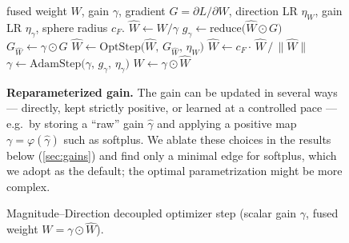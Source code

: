 \documentclass[10pt]{article} %
\newcommand{\What}{\widehat{W}}              %
\newcommand{\reduceop}{\mathrm{reduce}}
\newcommand{\OptStep}{\mathrm{OptStep}}
\newcommand{\AdamStep}{\mathrm{AdamStep}}
\begin{document}
\begin{figure}[t]
\begin{algorithm}[t]
\caption{Magnitude--Direction decoupled optimizer step (scalar gain $\gamma$, fused weight $W=\gamma\odot\What$).}
\label{alg:md-step}
\begin{algorithmic}[1]
\Require fused weight $W$, gain $\gamma$, gradient $G=\partial L/\partial W$, direction LR $\eta_W$, gain LR $\eta_\gamma$, sphere radius $c_F$.
\State $\What \leftarrow W / \gamma$ 
\State $g_\gamma \leftarrow \reduceop\big(\What \odot G\big)$ 
\State $G_{\What} \leftarrow \gamma \odot G$ \Comment{direction gradient $\partial L/\partial \What$}
\State $\What \leftarrow \OptStep\big(\What,\, G_{\What},\, \eta_W\big)$ 
\State $\What \leftarrow c_F \cdot \, \What \,/\, \lVert \What\rVert$ 
\State $\gamma \leftarrow \AdamStep\big(\gamma,\, g_\gamma,\, \eta_\gamma\big)$ 
\State $W \leftarrow \gamma \odot \What$ 
\end{algorithmic}
\end{algorithm}


\textbf{Reparameterized gain.} The gain can be updated in several ways --- directly, kept strictly positive, or learned at a controlled pace --- e.g.\ by storing a ``raw'' gain $\widehat{\gamma}$ and applying a positive map $\gamma = \varphi(\widehat{\gamma})$ such as softplus. We ablate these choices in the results below (\autoref{sec:gains}) and find only a minimal edge for softplus, which we adopt as the default; the optimal parametrization might be more complex.


\end{figure}
\end{document}

